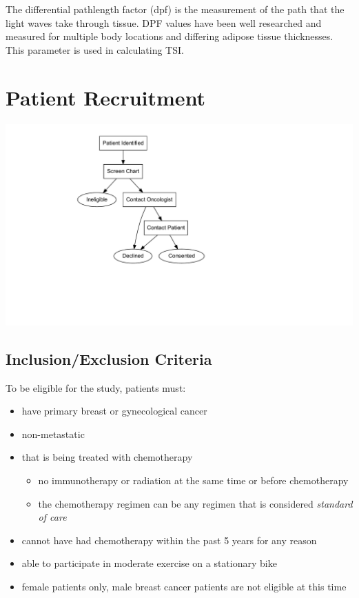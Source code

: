 \documentclass[
]{book}
\providecommand{\tightlist}{%
  \setlength{\itemsep}{0pt}\setlength{\parskip}{0pt}}
\begin{document}
The differential pathlength factor (dpf) is the measurement of the path that the light waves take through tissue. DPF values have been well researched and measured for multiple body locations and differing adipose tissue thicknesses. This parameter is used in calculating TSI.

\hypertarget{PatientRecruitment}{%
\chapter{Patient Recruitment}\label{PatientRecruitment}}

\includegraphics{nirs-study-info_files/figure-latex/unnamed-chunk-2-1.pdf}

\hypertarget{inclusionexclusion-criteria}{%
\section{Inclusion/Exclusion Criteria}\label{inclusionexclusion-criteria}}

To be eligible for the study, patients must:

\begin{itemize}
\tightlist
\item
  have primary breast or gynecological cancer
\item
  non-metastatic
\item
  that is being treated with chemotherapy

  \begin{itemize}
  \tightlist
  \item
    no immunotherapy or radiation at the same time or before chemotherapy
  \item
    the chemotherapy regimen can be any regimen that is considered \emph{standard of care}
  \end{itemize}
\item
  cannot have had chemotherapy within the past 5 years for any reason
\item
  able to participate in moderate exercise on a stationary bike
\item
  female patients only, male breast cancer patients are not eligible at this time
\end{itemize}
\end{document}
